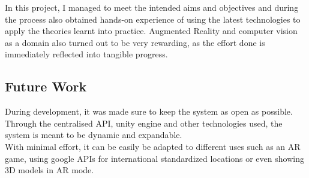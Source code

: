 In this project, I managed to meet the intended aims and objectives and during the process also 
obtained hands-on experience of using the latest technologies to apply the theories learnt into 
practice. 
Augmented Reality and computer vision as a domain also turned out to be very rewarding, 
as the effort done is immediately reflected into tangible progress.  

\subsection{Future Work}
During development, it was made sure to keep the system as open as possible. Through the 
centralised API, unity engine and other technologies used, the system is meant to be dynamic and 
expandable.\\
With minimal effort, it can be easily be adapted to different uses such as an AR game, 
using google APIs for international standardized locations or even showing 3D models in AR mode. 